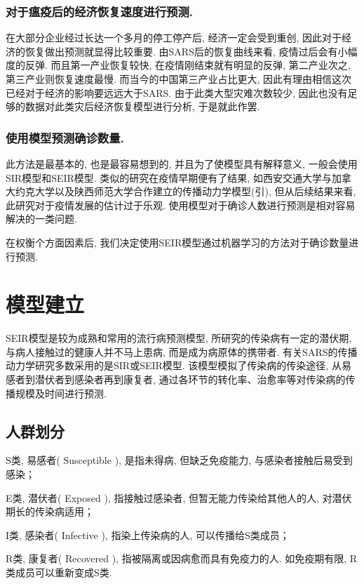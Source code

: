 \documentclass[lang=cn,11pt]{elegantpaper}
\begin{document}
\subsubsection*{对于瘟疫后的经济恢复速度进行预测. }
在大部分企业经过长达一个多月的停工停产后, 经济一定会受到重创, 因此对于经济的恢复做出预测就显得比较重要. 由SARS后的恢复曲线来看, 疫情过后会有小幅度的反弹. 而且第一产业恢复较快, 在疫情刚结束就有明显的反弹, 第二产业次之, 第三产业则恢复速度最慢. 而当今的中国第三产业占比更大, 因此有理由相信这次已经对于经济的影响要远远大于SARS. 由于此类大型灾难次数较少, 因此也没有足够的数据对此类灾后经济恢复模型进行分析, 于是就此作罢. 
\subsubsection*{使用模型预测确诊数量. }
此方法是最基本的, 也是最容易想到的, 并且为了使模型具有解释意义, 一般会使用SIR模型和SEIR模型. 类似的研究在疫情早期便有了结果, 如西安交通大学与加拿大约克大学以及陕西师范大学合作建立的传播动力学模型(引), 但从后续结果来看, 此研究对于疫情发展的估计过于乐观. 使用模型对于确诊人数进行预测是相对容易解决的一类问题. 

在权衡个方面因素后, 我们决定使用SEIR模型通过机器学习的方法对于确诊数量进行预测.
\section{模型建立} 
SEIR模型是较为成熟和常用的流行病预测模型, 所研究的传染病有一定的潜伏期, 与病人接触过的健康人并不马上患病, 而是成为病原体的携带者. 有关SARS的传播动力学研究多数采用的是SIR或SEIR模型. 该模型模拟了传染病的传染途径, 从易感者到潜伏者到感染者再到康复者, 通过各环节的转化率、治愈率等对传染病的传播规模及时间进行预测. 
\subsection{人群划分}
S类, 易感者( Susceptible ), 是指未得病, 但缺乏免疫能力, 与感染者接触后易受到感染；

E类, 潜伏者( Exposed ), 指接触过感染者, 但暂无能力传染给其他人的人, 对潜伏期长的传染病适用；

I类, 感染者( Infective ), 指染上传染病的人, 可以传播给S类成员；

R类, 康复者( Recovered ), 指被隔离或因病愈而具有免疫力的人. 如免疫期有限, R类成员可以重新变成S类.
\end{document}
